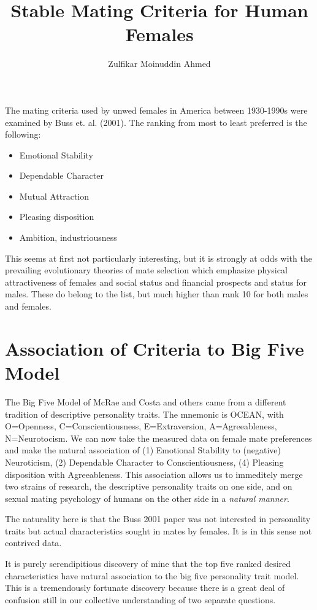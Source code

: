 \documentclass{article}
\title{Stable Mating Criteria for Human Females}
\author{Zulfikar Moinuddin Ahmed}
\begin{document}
\maketitle
The mating criteria used by unwed females in America between 1930-1990s were examined by Buss et. al. (2001). The ranking from most to least preferred is the following:
\begin{itemize}
\item{Emotional Stability}
\item{Dependable Character}
\item{Mutual Attraction}
\item{Pleasing disposition}
\item{Ambition, industriousness}
\end{itemize}

This seems at first not particularly interesting, but it is strongly at odds with the prevailing evolutionary theories of mate selection which emphasize physical attractiveness of females and social status and financial prospects and status for males.  These do belong to the list, but much higher than rank 10 for both males and females.

\section{Association of Criteria to Big Five Model}

The Big Five Model of McRae and Costa and others came from a different tradition of descriptive personality traits.  The mnemonic is OCEAN, with O=Openness, C=Conscientiousness, E=Extraversion,
A=Agreeableness, N=Neurotocism.  We can now take the measured data on female mate preferences and make the natural association of (1) Emotional Stability to (negative) Neuroticism, (2) Dependable Character to Conscientiousness, (4) Pleasing disposition with Agreeableness.  This association allows us to immeditely merge two strains of research, the descriptive personality traits on one side, and on sexual mating psychology of humans on the other side in a {\em natural manner}.  

The naturality here is that the Buss 2001 paper was not interested in personality traits but actual characteristics sought in mates by females.  It is in this sense not contrived data.  

It is purely serendipitious discovery of mine that the top five ranked desired characteristics have natural association to the big five personality trait model.  This is a tremendously fortunate discovery because there is a great deal of confusion still in our collective understanding of two separate questions.
\end{document}
